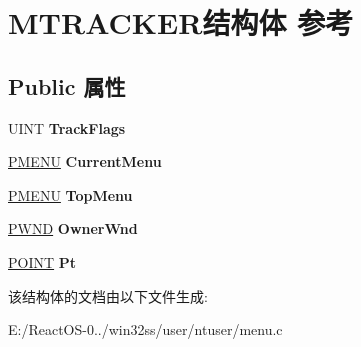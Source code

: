 \hypertarget{struct_m_t_r_a_c_k_e_r}{}\section{M\+T\+R\+A\+C\+K\+E\+R结构体 参考}
\label{struct_m_t_r_a_c_k_e_r}
\subsection*{Public 属性}
\begin{DoxyCompactItemize}
\item 
\mbox{\label{struct_m_t_r_a_c_k_e_r_ae69b633660c637c7581797cf0def7971}} 
U\+I\+NT {\bfseries Track\+Flags}
\item 
\mbox{\label{struct_m_t_r_a_c_k_e_r_a063ef225ecd9e6453dd3a082419ae4ca}} 
\hyperlink{structtag_m_e_n_u}{P\+M\+E\+NU} {\bfseries Current\+Menu}
\item 
\mbox{\label{struct_m_t_r_a_c_k_e_r_a3a7862b8c4ebb3060aa2c4f3f96814ac}} 
\hyperlink{structtag_m_e_n_u}{P\+M\+E\+NU} {\bfseries Top\+Menu}
\item 
\mbox{\label{struct_m_t_r_a_c_k_e_r_a34d03e5317502d15fdb8d760b303ab98}} 
\hyperlink{struct___w_n_d}{P\+W\+ND} {\bfseries Owner\+Wnd}
\item 
\mbox{\label{struct_m_t_r_a_c_k_e_r_a3b9503cd5228e82620582be8c26e6dca}} 
\hyperlink{structtag_p_o_i_n_t}{P\+O\+I\+NT} {\bfseries Pt}
\end{DoxyCompactItemize}


该结构体的文档由以下文件生成\+:\begin{DoxyCompactItemize}
\item 
E\+:/\+React\+O\+S-\/0../win32ss/user/ntuser/menu.\+c\end{DoxyCompactItemize}
